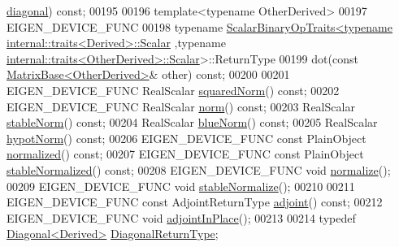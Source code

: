 \begin{DoxyCode}
      \hyperlink{group___core___module_ab5768147536273eb2dbdfa389cfd26a3}{diagonal}) \textcolor{keyword}{const};
00195 
00196     \textcolor{keyword}{template}<\textcolor{keyword}{typename} OtherDerived>
00197     EIGEN\_DEVICE\_FUNC
00198     \textcolor{keyword}{typename} \hyperlink{group___core___module_struct_eigen_1_1_scalar_binary_op_traits}{ScalarBinaryOpTraits<typename internal::traits<Derived>::Scalar}
      ,\textcolor{keyword}{typename} \hyperlink{struct_eigen_1_1internal_1_1traits}{internal::traits<OtherDerived>::Scalar}>::ReturnType
00199     dot(\textcolor{keyword}{const} \hyperlink{group___core___module_class_eigen_1_1_matrix_base}{MatrixBase<OtherDerived>}& other) \textcolor{keyword}{const};
00200 
00201     EIGEN\_DEVICE\_FUNC RealScalar \hyperlink{group___core___module_a8782faeb21e43908cdce47cec06fba23}{squaredNorm}() \textcolor{keyword}{const};
00202     EIGEN\_DEVICE\_FUNC RealScalar \hyperlink{group___core___module_a196c4ec3c8ffdf5bda45d0f617154975}{norm}() \textcolor{keyword}{const};
00203     RealScalar \hyperlink{group___core___module_ab84d3e64f855813b1eea4202c0697dc1}{stableNorm}() \textcolor{keyword}{const};
00204     RealScalar \hyperlink{group___core___module_a3f3faa00163c16824ff03e58a210c74c}{blueNorm}() \textcolor{keyword}{const};
00205     RealScalar \hyperlink{group___core___module_a32222d3b6677e6cdf0b801463f329b72}{hypotNorm}() \textcolor{keyword}{const};
00206     EIGEN\_DEVICE\_FUNC \textcolor{keyword}{const} PlainObject \hyperlink{group___core___module_a5cf2fd4c57e59604fd4116158fd34308}{normalized}() \textcolor{keyword}{const};
00207     EIGEN\_DEVICE\_FUNC \textcolor{keyword}{const} PlainObject \hyperlink{group___core___module_a399dca938633b9f8df5ec4beefeccec0}{stableNormalized}() \textcolor{keyword}{const};
00208     EIGEN\_DEVICE\_FUNC \textcolor{keywordtype}{void} \hyperlink{group___core___module_ad16303c47ba36f7a41ea264cb26bceb6}{normalize}();
00209     EIGEN\_DEVICE\_FUNC \textcolor{keywordtype}{void} \hyperlink{group___core___module_a0b1443fa322615379557ade3399a3c3c}{stableNormalize}();
00210 
00211     EIGEN\_DEVICE\_FUNC \textcolor{keyword}{const} AdjointReturnType \hyperlink{group___core___module_afacca1f88da57e5cd87dd07c8ff926bb}{adjoint}() \textcolor{keyword}{const};
00212     EIGEN\_DEVICE\_FUNC \textcolor{keywordtype}{void} \hyperlink{group___core___module_a51c5982c1f64e45a939515b701fa6f4a}{adjointInPlace}();
00213 
00214     \textcolor{keyword}{typedef} \hyperlink{group___core___module_class_eigen_1_1_diagonal}{Diagonal<Derived>} \hyperlink{group___core___module_class_eigen_1_1_diagonal}{DiagonalReturnType};

\end{DoxyCode}
